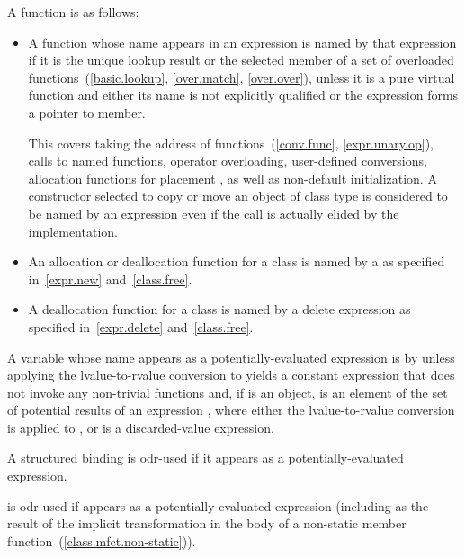 \pnum
{}%
A function is  as follows:
\begin{itemize}
\item
  A function whose name appears in an expression
  is named by that expression
  if it is the unique lookup result or the selected member
  of a set of overloaded functions~(\ref{basic.lookup}, \ref{over.match}, \ref{over.over}),
  unless it is a pure virtual function and either
  its name is not explicitly qualified or
  the expression forms a pointer to member.
  \begin{note} This covers
  taking the address of functions~(\ref{conv.func}, \ref{expr.unary.op}),
  calls to named functions,
  operator overloading,
  user-defined conversions,
  allocation functions for placement , as well as
  non-default initialization.
  A constructor selected to copy or move an object of class type
  is considered to be named by an expression
  even if the call is actually elided by the implementation. \end{note}
\item
  An allocation or deallocation function for a class
  is named by a 
  as specified in~\ref{expr.new} and~\ref{class.free}.
\item
  A deallocation function for a class
  is named by a delete expression
  as specified in~\ref{expr.delete} and~\ref{class.free}.
\end{itemize}

\pnum
A variable  whose name appears as a
potentially-evaluated expression  is  by  unless
applying the lvalue-to-rvalue conversion to  yields
a constant expression that does not invoke any non-trivial
functions
and, if  is an object,  is an element of
the set of potential results of an expression , where either the lvalue-to-rvalue
conversion is applied to , or  is
a discarded-value expression.

\pnum
A structured binding is odr-used if it appears as a potentially-evaluated expression.

\pnum
{} is odr-used if  appears as a potentially-evaluated expression
(including as the result of the implicit transformation in the body of a non-static
member function~(\ref{class.mfct.non-static})).

